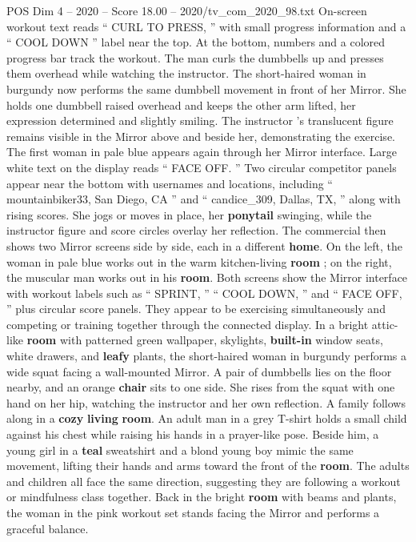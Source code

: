 \begin{textsample}{POS Dim 4 – 2020 – Score 18.00 – 2020/tv\_com\_2020\_98.txt}
On-screen workout text reads “ CURL TO PRESS, ” with small progress information and a “ COOL DOWN ” label near the top.
At the bottom, numbers and a colored progress bar track the workout.
The man curls the dumbbells up and presses them overhead while watching the instructor.
The short-haired woman in burgundy now performs the same dumbbell movement in front of her Mirror.
She holds one dumbbell raised overhead and keeps the other arm lifted, her expression determined and slightly smiling.
The instructor ’s translucent figure remains visible in the Mirror above and beside her, demonstrating the exercise.
The first woman in pale blue appears again through her Mirror interface.
Large white text on the display reads “ FACE OFF. ” Two circular competitor panels appear near the bottom with usernames and locations, including “ mountainbiker33, San Diego, CA ” and “ candice\_309, Dallas, TX, ” along with rising scores.
She jogs or moves in place, her \textbf{ponytail} swinging, while the instructor figure and score circles overlay her reflection.
The commercial then shows two Mirror screens side by side, each in a different \textbf{home}.
On the left, the woman in pale blue works out in the warm kitchen-living \textbf{room} ; on the right, the muscular man works out in his \textbf{room}.
Both screens show the Mirror interface with workout labels such as “ SPRINT, ” “ COOL DOWN, ” and “ FACE OFF, ” plus circular score panels.
They appear to be exercising simultaneously and competing or training together through the connected display.
In a bright attic-like \textbf{room} with patterned green wallpaper, skylights, \textbf{built-in} window seats, white drawers, and \textbf{leafy} plants, the short-haired woman in burgundy performs a wide squat facing a wall-mounted Mirror.
A pair of dumbbells lies on the floor nearby, and an orange \textbf{chair} sits to one side.
She rises from the squat with one hand on her hip, watching the instructor and her own reflection.
A family follows along in a \textbf{cozy} \textbf{living} \textbf{room}.
An adult man in a grey T-shirt holds a small child against his chest while raising his hands in a prayer-like pose.
Beside him, a young girl in a \textbf{teal} sweatshirt and a blond young boy mimic the same movement, lifting their hands and arms toward the front of the \textbf{room}.
The adults and children all face the same direction, suggesting they are following a workout or mindfulness class together.
Back in the bright \textbf{room} with beams and plants, the woman in the pink workout set stands facing the Mirror and performs a graceful balance.

\end{textsample}
